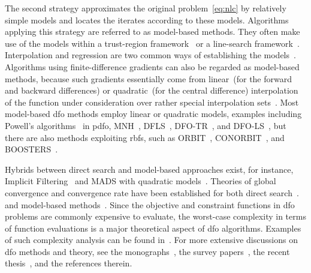 \documentclass[
    smallextended,  %
    final,          %
]{svjour3}
\begin{document}
The second strategy approximates the original problem~\eqref{eq:nlc} by relatively simple models and locates the iterates according to these models.
Algorithms applying this strategy are referred to as model-based methods. They often make use of the models within a trust-region framework~\cite{Conn_Scheinberg_Vicente_2009a} or a line-search framework~\cite{Berahas_Byrd_Nocedal_2019}.
Interpolation and regression are two common ways of establishing the models~\cite{Powell_2001,Conn_Scheinberg_Vicente_2008a,Conn_Scheinberg_Vicente_2008b,Wild_Regis_Shoemaker_2008,Bandeira_Scheinberg_Vicente_2012,Billups_Larson_Graf_2013,Regis_Wild_2017}.
Algorithms using finite-difference gradients can also be regarded as model-based
methods, because such gradients essentially come from linear~(for the forward and backward
differences) or quadratic~(for the central difference) interpolation of the function under
consideration over rather special interpolation sets~\cite[\S~1.4.3]{Ragonneau_2022}.
Most model-based \gls{dfo} methods employ linear or quadratic models, examples including
Powell's algorithms~\cite{Powell_1994,Powell_2002,Powell_2006,Powell_2009} in \gls{pdfo},
MNH~\cite{Wild_2008}, DFLS~\cite{Zhang_Conn_Scheinberg_2010},
DFO-TR~\cite{Bandeira_Scheinberg_Vicente_2012}, and DFO-LS~\cite{Cartis_Etal_2019,Hough_Roberts_2022},
but there are also methods exploiting \glspl{rbf}, such as ORBIT~\cite{Wild_Regis_Shoemaker_2008}, CONORBIT~\cite{Regis_Wild_2017}, and BOOSTERS~\cite{Oeuvray_Bierlaire_2009}.

Hybrids between direct search and model-based approaches exist, for
instance, Implicit Filtering~\cite[Algorithm~4.7]{Kelley_2011} and MADS with quadratic models~\cite{Conn_Digabel_2013}.
Theories of global convergence and convergence rate have been established for both
direct search~\cite{Torczon_1997,Kolda_Lewis_Torczon_2003,Vicente_2013,Gratton_Etal_2015,Dodangeh_Vicente_2016}.
and model-based methods~\cite{Conn_Scheinberg_Toint_1997a,Conn_Scheinberg_Vicente_2009a,Powell_2012,Garmanjani_Judice_Vicente_2016}.
Since the objective and constraint functions in \gls{dfo} problems are commonly expensive to
evaluate, the worst-case complexity in terms of function evaluations is a major theoretical aspect of \gls{dfo} algorithms.
Examples of such complexity analysis can be found in~\cite{Vicente_2013,Gratton_Etal_2015,Dodangeh_Vicente_2016,Garmanjani_Judice_Vicente_2016}.
For more extensive discussions on \gls{dfo} methods and theory, see the monographs~\cite{Conn_Scheinberg_Vicente_2009b,Audet_Hare_2017}, the survey
papers~\cite{Rios_Sahinidis_2013,Custodio_Scheinberg_Vicente_2017,Larson_Menickelly_Wild_2019}, the recent thesis~\cite{Ragonneau_2022}, and the references therein.
\end{document}
